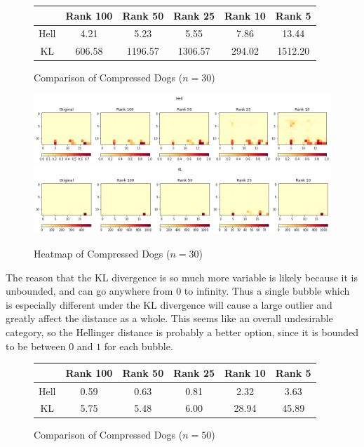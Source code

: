 \documentclass{article}
\begin{document}
\begin{figure}[h!]
\begin{center}
\begin{tabular}{ c || c | c | c | c | c }
    & Rank 100 & Rank 50 & Rank 25 & Rank 10 & Rank 5 \\ \hline
    Hell & 4.21 & 5.23 & 5.55 & 7.86 & 13.44 \\
    KL & 606.58 & 1196.57 & 1306.57 & 294.02 & 1512.20
\end{tabular}
\caption{Comparison of Compressed Dogs ($n=30$)}
\label{fig:dog30}
\end{center}
\end{figure}

\begin{figure}[h!]
\begin{center}
\includegraphics[width=\textwidth]{hell-dogs-30.png}
\includegraphics[width=\textwidth]{kl-dogs-30.png}
\caption{Heatmap of Compressed Dogs ($n=30$)}
\label{fig:dogheat30}
\end{center}
\end{figure}

The reason that the KL divergence is so much more variable is likely because it is unbounded, and can go anywhere from 0 to infinity. Thus a single bubble which is especially different under the KL divergence will cause a large outlier and greatly affect the distance as a whole. This seems like an overall undesirable category, so the Hellinger distance is probably a better option, since it is bounded to be between $0$ and $1$ for each bubble.

\begin{figure}[h!]
\begin{center}
\begin{tabular}{ c || c | c | c | c | c }
    & Rank 100 & Rank 50 & Rank 25 & Rank 10 & Rank 5 \\ \hline
    Hell & 0.59 & 0.63 & 0.81 & 2.32 & 3.63 \\
    KL & 5.75 & 5.48 & 6.00 & 28.94 & 45.89
\end{tabular}
\caption{Comparison of Compressed Dogs ($n=50$)}
\label{fig:dog50}
\end{center}
\end{figure}
\end{document}
